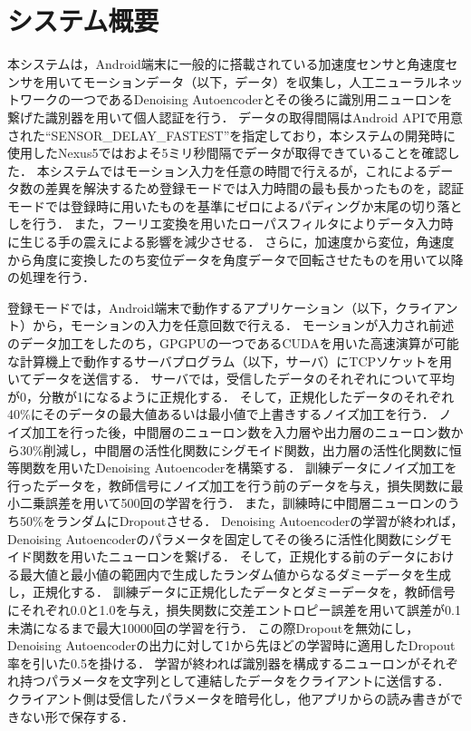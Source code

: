 \section{システム概要}
本システムは，Android端末に一般的に搭載されている加速度センサと角速度センサを用いてモーションデータ（以下，データ）を収集し，人工ニューラルネットワークの一つであるDenoising Autoencoderとその後ろに識別用ニューロンを繋げた識別器を用いて個人認証を行う．
データの取得間隔はAndroid APIで用意された``SENSOR\_DELAY\_FASTEST''を指定しており，本システムの開発時に使用したNexus5ではおよそ5ミリ秒間隔でデータが取得できていることを確認した．
本システムではモーション入力を任意の時間で行えるが，これによるデータ数の差異を解決するため登録モードでは入力時間の最も長かったものを，認証モードでは登録時に用いたものを基準にゼロによるパディングか末尾の切り落としを行う．
また，フーリエ変換を用いたローパスフィルタによりデータ入力時に生じる手の震えによる影響を減少させる．
さらに，加速度から変位，角速度から角度に変換したのち変位データを角度データで回転させたものを用いて以降の処理を行う．

登録モードでは，Android端末で動作するアプリケーション（以下，クライアント）から，モーションの入力を任意回数で行える．
モーションが入力され前述のデータ加工をしたのち，GPGPUの一つであるCUDAを用いた高速演算が可能な計算機上で動作するサーバプログラム（以下，サーバ）にTCPソケットを用いてデータを送信する．
サーバでは，受信したデータのそれぞれについて平均が0，分散が1になるように正規化する．
そして，正規化したデータのそれぞれ40\%にそのデータの最大値あるいは最小値で上書きするノイズ加工を行う．
ノイズ加工を行った後，中間層のニューロン数を入力層や出力層のニューロン数から30\%削減し，中間層の活性化関数にシグモイド関数，出力層の活性化関数に恒等関数を用いたDenoising Autoencoderを構築する．
訓練データにノイズ加工を行ったデータを，教師信号にノイズ加工を行う前のデータを与え，損失関数に最小二乗誤差を用いて500回の学習を行う．
また，訓練時に中間層ニューロンのうち50\%をランダムにDropoutさせる．
Denoising Autoencoderの学習が終われば，Denoising Autoencoderのパラメータを固定してその後ろに活性化関数にシグモイド関数を用いたニューロンを繋げる．
そして，正規化する前のデータにおける最大値と最小値の範囲内で生成したランダム値からなるダミーデータを生成し，正規化する．
訓練データに正規化したデータとダミーデータを，教師信号にそれぞれ0.0と1.0を与え，損失関数に交差エントロピー誤差を用いて誤差が0.1未満になるまで最大10000回の学習を行う．
この際Dropoutを無効にし，Denoising Autoencoderの出力に対して1から先ほどの学習時に適用したDropout率を引いた0.5を掛ける．
学習が終われば識別器を構成するニューロンがそれぞれ持つパラメータを文字列として連結したデータをクライアントに送信する．
クライアント側は受信したパラメータを暗号化し，他アプリからの読み書きができない形で保存する．

